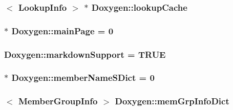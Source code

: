 \subsubsection[{lookup\+Cache}]{$<$ {\bf Lookup\+Info} $>$ $\ast$ Doxygen\+::lookup\+Cache\hspace{0.3cm}{\ttfamily [static]}}\label{class_doxygen_a68ae110f5af9b5ceff4a5c9d1cca1607}
\hypertarget{class_doxygen_ab02c8d98cdc6b4bf1d81a0b0cf4b4ecb}{}
\subsubsection[{main\+Page}]{ $\ast$ Doxygen\+::main\+Page = 0\hspace{0.3cm}{\ttfamily [static]}}\label{class_doxygen_ab02c8d98cdc6b4bf1d81a0b0cf4b4ecb}
\hypertarget{class_doxygen_af9c005860944572c032482c0c9b7a172}{}
\subsubsection[{markdown\+Support}]{ Doxygen\+::markdown\+Support = {\bf T\+R\+U\+E}\hspace{0.3cm}{\ttfamily [static]}}\label{class_doxygen_af9c005860944572c032482c0c9b7a172}
\hypertarget{class_doxygen_ac75eb04ae261400f216eb827dd8b2180}{}
\subsubsection[{member\+Name\+S\+Dict}]{ $\ast$ Doxygen\+::member\+Name\+S\+Dict = 0\hspace{0.3cm}{\ttfamily [static]}}\label{class_doxygen_ac75eb04ae261400f216eb827dd8b2180}
\hypertarget{class_doxygen_af1fc60f2ca0c90aabbbd1184bf0c05d3}{}
\subsubsection[{mem\+Grp\+Info\+Dict}]{$<$ {\bf Member\+Group\+Info} $>$ Doxygen\+::mem\+Grp\+Info\+Dict\hspace{0.3cm}{\ttfamily [static]}}\label{class_doxygen_af1fc60f2ca0c90aabbbd1184bf0c05d3}
\hypertarget{class_doxygen_a6404daceb4b72823e5745fe4a2d4129d}{}
